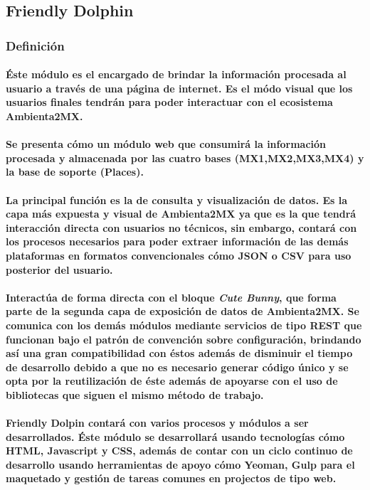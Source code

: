 \subsection{Friendly Dolphin}
    \subsubsection{Definición}
      \paragraph{Éste módulo es el encargado de brindar la información procesada al usuario a través de una página de internet. Es el módo visual que los usuarios finales tendrán para poder interactuar con el ecosistema Ambienta2MX.}
      \paragraph{Se presenta cómo un módulo web que consumirá la información procesada y almacenada por las cuatro bases (MX1,MX2,MX3,MX4) y la base de soporte (Places).}
      \paragraph{La principal función es la de consulta y visualización de datos. Es la capa más expuesta y visual de Ambienta2MX ya que es la que tendrá interacción directa con usuarios no técnicos, sin embargo, contará con los procesos necesarios para poder extraer información de las demás plataformas en formatos convencionales cómo JSON o CSV para uso posterior del usuario.}
      \paragraph{Interactúa de forma directa con el bloque \textbf{\emph{Cute Bunny}}, que forma parte de la segunda capa de exposición de datos de Ambienta2MX. Se comunica con los demás módulos mediante servicios de tipo REST que funcionan bajo el patrón de convención sobre configuración\cite{8}, brindando así una gran compatibilidad con éstos además de disminuir el tiempo de desarrollo debido a que no es necesario generar código único y se opta por la reutilización de éste además de apoyarse con el uso de bibliotecas que siguen el mismo método de trabajo.}
      \paragraph{Friendly Dolpin contará con varios procesos y módulos a ser desarrollados. Éste módulo se desarrollará usando tecnologías cómo HTML, Javascript y CSS, además de contar con un ciclo continuo de desarrollo usando herramientas de apoyo cómo Yeoman, Gulp para el maquetado y gestión de tareas comunes en projectos de tipo web.}
